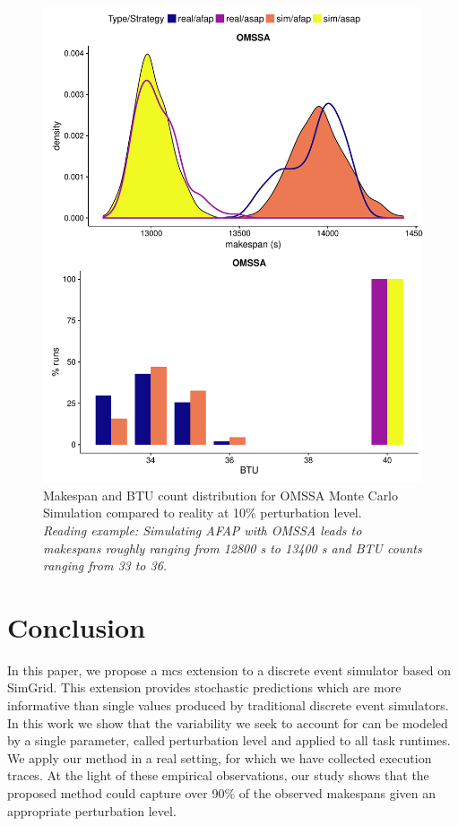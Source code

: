 \documentclass[10pt,conference,compsocconf]{IEEEtran}
\begin{document}
\begin{figure}
	\center
	\includegraphics[width=1.0\linewidth]{gfx/PP_fit.pdf}
	\caption[caption]{Makespan and BTU count distribution for OMSSA Monte
	  Carlo Simulation compared to reality at 10\% perturbation level.\\ 
	  \textit{Reading example: Simulating AFAP with OMSSA leads to makespans 
	  roughly ranging from 12800 s to 13400 s and BTU counts ranging from 33 to 36.}
	}
	\label{fig:fit}
\end{figure}

\section{Conclusion}
In this paper, we propose a \acl{mcs} extension  to a  discrete  event  simulator based  on
SimGrid.  This  extension provides stochastic predictions which are more
informative than single values produced by
traditional discrete  event simulators. In this work we show that the
variability we seek to account for can be modeled  by a  single parameter,
called perturbation  level and applied  to all task runtimes. We apply
our method in  a real setting, for which we have collected  execution traces.  
At  the light of  these empirical observations, our study shows that the
proposed method could capture over 90\% of the observed makespans given  an
appropriate perturbation  level.



\end{document}

